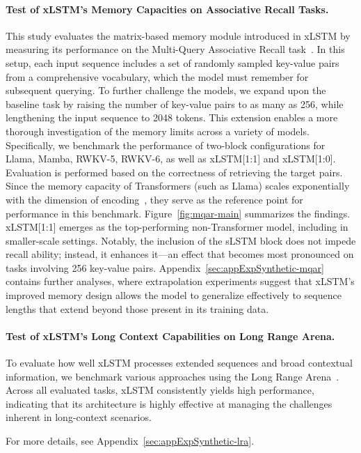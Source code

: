 \paragraph{Test of xLSTM's Memory Capacities on Associative Recall Tasks.} This study evaluates the matrix-based memory module introduced in xLSTM by measuring its performance on the Multi-Query Associative Recall task~\citep{Arora:23arxiv}. In this setup, each input sequence includes a set of randomly sampled key-value pairs from a comprehensive vocabulary, which the model must remember for subsequent querying. To further challenge the models, we expand upon the baseline task by raising the number of key-value pairs to as many as 256, while lengthening the input sequence to 2048 tokens. This extension enables a more thorough investigation of the memory limits across a variety of models. Specifically, we benchmark the performance of two-block configurations for Llama, Mamba, RWKV-5, RWKV-6, as well as xLSTM[1:1] and xLSTM[1:0]. Evaluation is performed based on the correctness of retrieving the target pairs. Since the memory capacity of Transformers (such as Llama) scales exponentially with the dimension of encoding~\citep{Ramsauer:21}, they serve as the reference point for performance in this benchmark. Figure~\ref{fig:mqar-main} summarizes the findings. 
xLSTM[1:1] emerges as the top-performing non-Transformer model, including in smaller-scale settings. Notably, the inclusion of the sLSTM block does not impede recall ability; instead, it enhances it—an effect that becomes most pronounced on tasks involving 256 key-value pairs. Appendix~\ref{sec:appExpSynthetic-mqar} contains further analyses, where extrapolation experiments suggest that xLSTM’s improved memory design allows the model to generalize effectively to sequence lengths that extend beyond those present in its training data.

\paragraph{Test of xLSTM's Long Context Capabilities on Long Range Arena.} To evaluate how well xLSTM processes extended sequences and broad contextual information, we benchmark various approaches using the Long Range Arena~\citep{Tay:21}. Across all evaluated tasks, xLSTM consistently yields high performance, indicating that its architecture is highly effective at managing the challenges inherent in long-context scenarios.

For more details, see Appendix~\ref{sec:appExpSynthetic-lra}.

